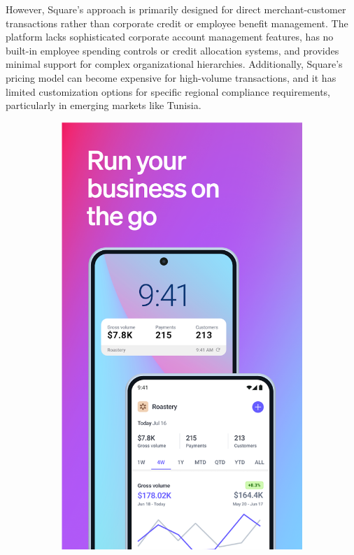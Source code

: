 However, Square's approach is primarily designed for direct merchant-customer transactions rather than corporate credit or employee benefit management. The platform lacks sophisticated corporate account management features, has no built-in employee spending controls or credit allocation systems, and provides minimal support for complex organizational hierarchies. Additionally, Square's pricing model can become expensive for high-volume transactions, and it has limited customization options for specific regional compliance requirements, particularly in emerging markets like Tunisia.

\clearpage

\begin{figure}[!htb]
    \centering
    \begin{subfigure}[b]{0.32\textwidth}
        \centering
        \includegraphics[width=\textwidth]{images/stripe_screenshot_1.png}

\end{subfigure}
\end{figure}
